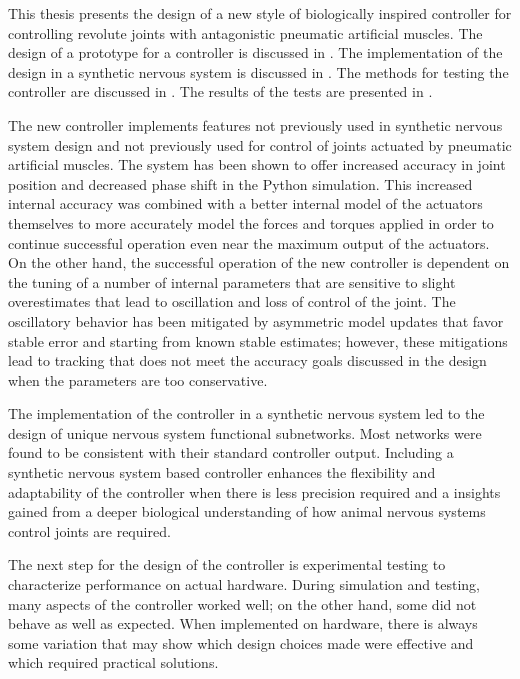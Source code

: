 
This thesis presents the design of a new style of biologically inspired
controller for controlling revolute joints with antagonistic pneumatic
artificial muscles. The
design of a prototype for a controller is discussed in
. The implementation of the design in a
synthetic nervous system is discussed in . The methods
for testing the controller are discussed in . The results of
the tests are presented in .

The new controller implements features not previously used in synthetic nervous
system design and not previously used for control of joints actuated by
pneumatic artificial muscles. The system has been shown to offer
increased accuracy in joint position and decreased phase shift in the Python simulation. This increased internal accuracy was
combined with a better internal model of the actuators themselves to more
accurately model the forces and torques applied in order to continue successful
operation even near the maximum output of the actuators. On the other hand, the
successful operation of the new controller is dependent on the tuning of a number of
internal parameters that are sensitive to slight overestimates that lead to
oscillation and loss of control of the joint. The oscillatory behavior has been mitigated by
asymmetric model updates that favor stable error and starting from known stable
estimates; however, these mitigations lead to tracking that does not meet the accuracy goals
discussed in the design when the parameters are too conservative.

The implementation of the controller in a synthetic nervous system led to the
design of unique nervous system functional subnetworks. Most networks
were found to be consistent with their standard controller output.
Including a synthetic nervous system based controller enhances the flexibility and adaptability of the controller when there is less precision required and a insights gained from a deeper biological understanding of how animal nervous systems control joints are required.


The next step for the design of the controller is experimental testing to
characterize performance on actual hardware. During simulation and testing,
many aspects of the controller worked well; on the other hand, some did not
behave as well as expected. When implemented on hardware, there is always some variation that may
show which design choices made were effective and which required practical solutions.

